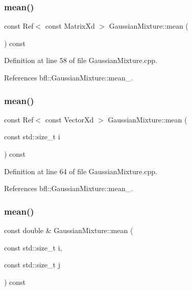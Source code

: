 \subsubsection{\texorpdfstring{mean()}{mean()}\hspace{0.1cm}{\footnotesize\ttfamily [4/6]}}
{\footnotesize\ttfamily const Ref$<$ const Matrix\+Xd $>$ Gaussian\+Mixture\+::mean (\begin{DoxyParamCaption}{ }\end{DoxyParamCaption}) const\hspace{0.3cm}{\ttfamily [inherited]}}



Definition at line 58 of file Gaussian\+Mixture.\+cpp.



References bfl\+::\+Gaussian\+Mixture\+::mean\+\_\+.

\mbox{\label{classbfl_1_1GaussianMixture_ad0dab37b16097d498dedaf23d0af3c18}} 
\subsubsection{\texorpdfstring{mean()}{mean()}\hspace{0.1cm}{\footnotesize\ttfamily [5/6]}}
{\footnotesize\ttfamily const Ref$<$ const Vector\+Xd $>$ Gaussian\+Mixture\+::mean (\begin{DoxyParamCaption}\item[{const std\+::size\+\_\+t}]{i }\end{DoxyParamCaption}) const\hspace{0.3cm}{\ttfamily [inherited]}}



Definition at line 64 of file Gaussian\+Mixture.\+cpp.



References bfl\+::\+Gaussian\+Mixture\+::mean\+\_\+.

\mbox{\label{classbfl_1_1GaussianMixture_ac3baa237bc22f156f57d4c02deb4f518}} 
\subsubsection{\texorpdfstring{mean()}{mean()}\hspace{0.1cm}{\footnotesize\ttfamily [6/6]}}
{\footnotesize\ttfamily const double \& Gaussian\+Mixture\+::mean (\begin{DoxyParamCaption}\item[{const std\+::size\+\_\+t}]{i,  }\item[{const std\+::size\+\_\+t}]{j }\end{DoxyParamCaption}) const\hspace{0.3cm}{\ttfamily [inherited]}}



